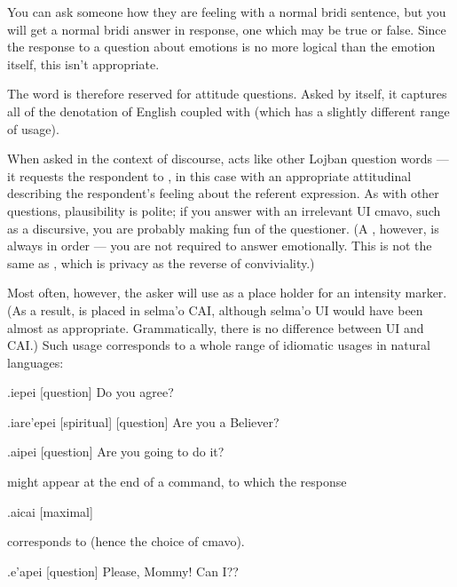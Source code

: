 You can ask someone how they are feeling with a normal bridi
    sentence, but you will get a normal bridi answer in response,
    one which may be true or false. Since the response to a
    question about emotions is no more logical than the emotion
    itself, this isn't appropriate.

The word  is therefore reserved for attitude
    questions. Asked by itself, it captures all of the denotation
    of English  coupled with 
    (which has a slightly different range of usage).

When asked in the context of discourse,  acts like
    other Lojban question words --- it requests the respondent to
    , in this case with an appropriate
    attitudinal describing the respondent's feeling about the
    referent expression. As with other questions, plausibility is
    polite; if you answer with an irrelevant UI cmavo, such as a
    discursive, you are probably making fun of the questioner. (A
    , however, is always in order --- you are not required
    to answer emotionally. This is not the same as ,
    which is privacy as the reverse of conviviality.)

Most often, however, the asker will use  as a place
    holder for an intensity marker. (As a result,  is placed
    in selma'o CAI, although selma'o UI would have been almost as
    appropriate. Grammatically, there is no difference between UI
    and CAI.) Such usage corresponds to a whole range of idiomatic
    usages in natural languages:
\begin{example}
.iepei\n
{} [question]\n
Do you agree?
\end{example}

\begin{example}
.iare'epei\n
{} [spiritual] [question]\n
Are you a Believer?
\end{example}

\begin{example}
.aipei\n
{} [question]\n
Are you going to do it?
\end{example}

 might appear at the end of a
    command, to which the response
\begin{example}
.aicai\n
{} [maximal]
\end{example}

{\noindent}corresponds to  (hence the choice of cmavo).
\begin{example}
.e'apei\n
{} [question]\n
Please, Mommy!  Can I??
\end{example}

